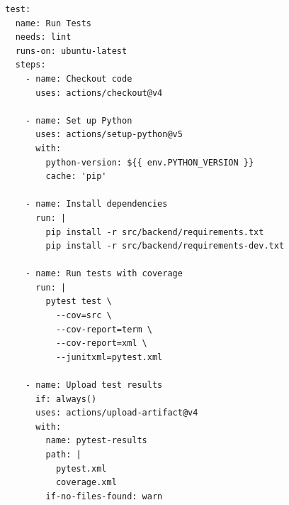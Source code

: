 \documentclass[12pt, titlepage]{article}
\begin{document}
\begin{verbatim}
  test:
    name: Run Tests
    needs: lint
    runs-on: ubuntu-latest
    steps:
      - name: Checkout code
        uses: actions/checkout@v4
      
      - name: Set up Python
        uses: actions/setup-python@v5
        with:
          python-version: ${{ env.PYTHON_VERSION }}
          cache: 'pip'
          
      - name: Install dependencies
        run: |
          pip install -r src/backend/requirements.txt
          pip install -r src/backend/requirements-dev.txt
      
      - name: Run tests with coverage
        run: |
          pytest test \
            --cov=src \
            --cov-report=term \
            --cov-report=xml \
            --junitxml=pytest.xml

      - name: Upload test results
        if: always()
        uses: actions/upload-artifact@v4
        with:
          name: pytest-results
          path: |
            pytest.xml
            coverage.xml
          if-no-files-found: warn
\end{verbatim}
\end{document}
